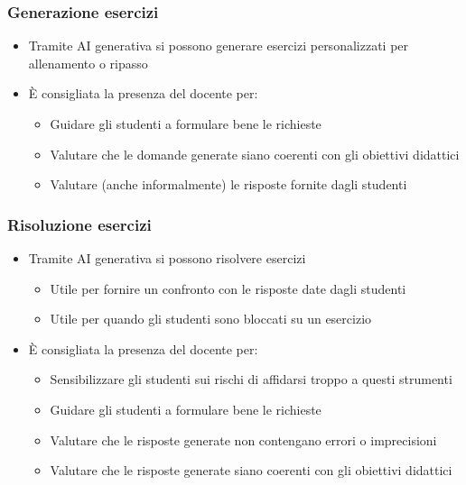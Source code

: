 \begin{contentframe}
    \frametitle{Generazione esercizi}

    \begin{itemize}
        \item Tramite AI generativa si possono generare esercizi personalizzati per allenamento o ripasso

        \bigskip
        \item È consigliata la presenza del docente per:
        \begin{itemize}
            \item Guidare gli studenti a formulare bene le richieste
            \item Valutare che le domande generate siano coerenti con gli obiettivi didattici
            \item Valutare (anche informalmente) le risposte fornite dagli studenti
        \end{itemize}
    \end{itemize}
\end{contentframe}

\begin{contentframe}
    \frametitle{Risoluzione esercizi}

    \begin{itemize}
        \item Tramite AI generativa si possono risolvere esercizi
        \begin{itemize}
            \item Utile per fornire un confronto con le risposte date dagli studenti
            \item Utile per quando gli studenti sono bloccati su un esercizio
        \end{itemize}

        \bigskip
        \item È consigliata la presenza del docente per:
        \begin{itemize}
            \item Sensibilizzare gli studenti sui rischi di affidarsi troppo a questi strumenti
            \item Guidare gli studenti a formulare bene le richieste
            \item Valutare che le risposte generate non contengano errori o imprecisioni
            \item Valutare che le risposte generate siano coerenti con gli obiettivi didattici
        \end{itemize}
    \end{itemize}
\end{contentframe}

